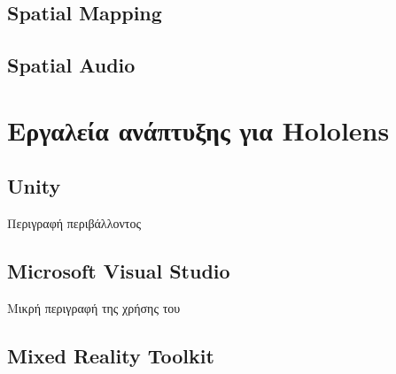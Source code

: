\subsection{Spatial Mapping}

\subsection{Spatial Audio}


\section{Εργαλεία ανάπτυξης για Hololens}\label{sec:hololensTools}

\subsection{Unity}
Περιγραφή περιβάλλοντος

\subsection{Microsoft Visual Studio}
Μικρή περιγραφή της χρήσης του

\subsection{Mixed Reality Toolkit}

